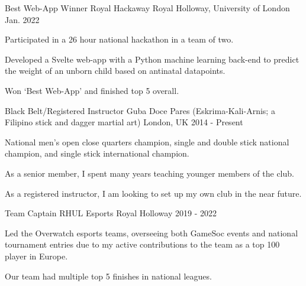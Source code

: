 


\begin{cventries}


\cventry
{Best Web-App Winner} %
{Royal Hackaway} %
{Royal Holloway, University of London} %
{Jan. 2022} %
{ %
\begin{cvitems}
\item {Participated in a 26 hour national hackathon in a team of two.}
\item {Developed a Svelte web-app with a Python machine learning back-end to predict the weight of an unborn child based on antinatal datapoints.}
\item {Won `Best Web-App' and finished top 5 overall.}
\end{cvitems}
}


\cventry
{Black Belt/Registered Instructor} %
{Guba Doce Pares \tiny{(Eskrima-Kali-Arnis; a Filipino stick and dagger martial art)}} %
{London, UK} %
{2014 - Present} %
{ %
\begin{cvitems}
\item {National men's open close quarters champion, single and double stick national champion, and single stick international champion.}
\item {As a senior member, I spent many years teaching younger members of the club.}
\item {As a registered instructor, I am looking to set up my own club in the near future.}
\end{cvitems}
}



\cventry
{Team Captain} %
{RHUL Esports} %
{Royal Holloway} %
{2019 - 2022} %
{ %
\begin{cvitems}
\item {Led the Overwatch esports teams, overseeing both GameSoc events and national tournament entries due to my active contributions to the team as a top 100 player in Europe.}
\item {Our team had multiple top 5 finishes in national leagues.}
\end{cvitems}
}


\end{cventries}
